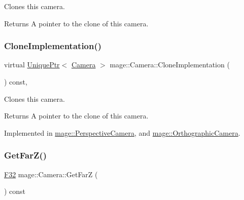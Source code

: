 Clones this camera.

\begin{DoxyReturn}{Returns}
A pointer to the clone of this camera. 
\end{DoxyReturn}
\hypertarget{classmage_1_1_camera_aedf6e7d6ee6c6e9e82da814ef8e705ab}{}\label{classmage_1_1_camera_aedf6e7d6ee6c6e9e82da814ef8e705ab} 
\subsubsection{\texorpdfstring{Clone\+Implementation()}{CloneImplementation()}}
{\footnotesize\ttfamily virtual \hyperlink{namespacemage_a3316d7143a973e37adf1110f2e80ca31}{Unique\+Ptr}$<$ \hyperlink{classmage_1_1_camera}{Camera} $>$ mage\+::\+Camera\+::\+Clone\+Implementation (\begin{DoxyParamCaption}{ }\end{DoxyParamCaption}) const\hspace{0.3cm}{\ttfamily [private]}, {}}

Clones this camera.

\begin{DoxyReturn}{Returns}
A pointer to the clone of this camera. 
\end{DoxyReturn}


Implemented in \hyperlink{classmage_1_1_perspective_camera_aa597ab884256b7e6fad63653af3ac789}{mage\+::\+Perspective\+Camera}, and \hyperlink{classmage_1_1_orthographic_camera_aeef89cff8f4272b1412fa3ce366e656d}{mage\+::\+Orthographic\+Camera}.

\hypertarget{classmage_1_1_camera_a47e6801d228891453540b0c1e787724a}{}\label{classmage_1_1_camera_a47e6801d228891453540b0c1e787724a} 
\subsubsection{\texorpdfstring{Get\+Far\+Z()}{GetFarZ()}}
{\footnotesize\ttfamily \hyperlink{namespacemage_aa97e833b45f06d60a0a9c4fc22ae02c0}{F32} mage\+::\+Camera\+::\+Get\+FarZ (\begin{DoxyParamCaption}{ }\end{DoxyParamCaption}) const\hspace{0.3cm}{\ttfamily [noexcept]}}

